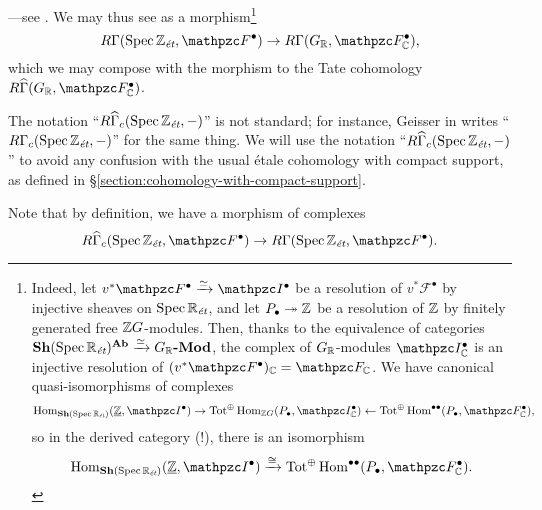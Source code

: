 \noindent---see \cite[Exposé VII, 2.3]{SGA4}. We may thus see
 as a morphism\footnote{Indeed, let
  $v^* \mathcal{F}^\bullet \xrightarrow{\quiso} \mathcal{I}^\bullet$ be a
  resolution of $v^* \mathcal{F}^\bullet$ by injective sheaves on
  $\operatorname{Spec} \mathbb{R}_\text{\it ét}$, and let $P_\bullet \twoheadrightarrow \mathbb{Z}$ be a resolution of
  $\mathbb{Z}$ by finitely generated free $\mathbb{Z} G$-modules. Then, thanks to the
  equivalence of categories
  $\text{\bf Sh} (\operatorname{Spec} \mathbb{R}_\text{\it ét})^{\text{\bf Ab}} \xrightarrow{\simeq}
  G_{\mathbb{R}}\text{\bf -Mod}$, the complex of $G_{\mathbb{R}}$-modules $\mathcal{I}^\bullet_\CC$
  is an injective resolution of
  $(v^* \mathcal{F}^\bullet)_\CC = \mathcal{F}_\CC$. We have canonical
  quasi-isomorphisms of complexes
  \[ \Hom_{\categ{Sh} (\Spec \RR_\text{\it ét})} (\underline{\ZZ}, \mathcal{I}^\bullet) \to
    \Tot^\oplus \Hom_{\ZZ G} (P_\bullet, \mathcal{I}^\bullet_\CC) \leftarrow
    \Tot^\oplus \Hom^{\bullet\bullet} (P_\bullet, \mathcal{F}^\bullet_\CC), \]
  so in the derived category (!), there is an isomorphism
  \[ \Hom_{\categ{Sh} (\Spec \RR_\text{\it ét})} (\underline{\ZZ}, \mathcal{I}^\bullet) \xrightarrow{\isom}
    \Tot^\oplus \Hom^{\bullet\bullet} (P_\bullet, \mathcal{F}^\bullet_\CC). \]}
\[ R\Gamma (\Spec \ZZ_\text{\it ét}, \mathcal{F}^\bullet) \to
  R\Gamma (G_\RR, \mathcal{F}^\bullet_\CC), \]
which we may compose with the morphism
 to the Tate cohomology
$R\widehat{\Gamma} (G_\RR, \mathcal{F}^\bullet_\CC)$.

\vspace{1em}

The notation ``$R\widehat{\Gamma}_c (\operatorname{Spec} \mathbb{Z}_\text{\it ét}, -)$'' is not
standard; for instance, Geisser in \cite{Geisser-10} writes
``$R\Gamma_c (\operatorname{Spec} \mathbb{Z}_\text{\it ét}, -)$'' for the same thing. We will use the
notation ``$R\widehat{\Gamma}_c (\operatorname{Spec} \mathbb{Z}_\text{\it ét}, -)$'' to avoid any
confusion with the usual étale cohomology with compact support, as defined in
\S\ref{section:cohomology-with-compact-support}.

Note that by definition, we have a morphism of complexes
\begin{equation}
  \label{eqn:morphism-fromRGammahatc-to-RGamma-on-SpecZ}
  R\widehat{\Gamma}_c (\Spec \ZZ_\text{\it ét}, \mathcal{F}^\bullet) \to
  R\Gamma (\Spec \ZZ_\text{\it ét}, \mathcal{F}^\bullet).
\end{equation}

